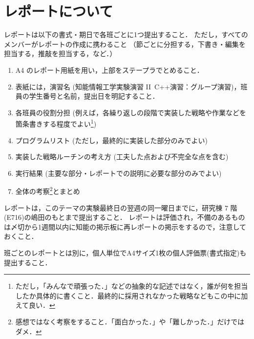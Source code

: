 \section{レポートについて}
レポートは以下の書式・期日で各班ごとに1つ提出すること．
ただし，すべてのメンバーがレポートの作成に携わること
（節ごとに分担する，下書き・編集を担当する，推敲を担当する，など．）
\begin{enumerate}
 \item A4 のレポート用紙を用い，上部をステープラでとめること．\vspace*{-0.5em}
 \item 表紙には，演習名 (知能情報工学実験演習 II\ C++演習：グループ演習)，班員の学生番号と名前，提出日を明記すること．\vspace*{-0.5em}
 \item 各班員の役割分担 (例えば，各繰り返しの段階で実装した戦略や作業などを箇条書きする程度でよい\footnote{ただし，「みんなで頑張った．」などの抽象的な記述ではなく，誰が何を担当したか具体的に書くこと．最終的に採用されなかった戦略などもこの中に加えて良い．})\vspace*{-0.5em}
 \item プログラムリスト (ただし，最終的に実装した部分のみでよい)\vspace*{-0.5em}
 \item 実装した戦略ルーチンの考え方 (工夫した点および不完全な点を含む)\vspace*{-0.5em}
 \item 実行結果 (主要な部分・レポートでの説明に必要な部分のみでよい)\vspace*{-0.5em}
 \item 全体の考察\footnote{感想ではなく考察をすること．「面白かった．」や「難しかった．」だけではダメ．}とまとめ\vspace*{-0.5em}
 \end{enumerate}
レポートは，このテーマの実験最終日の翌週の同一曜日までに，研究棟 7 階(E716)の嶋田のもとまで提出すること．
レポートは評価され，不備のあるものは〆切から1週間以内に知能の掲示板に再レポートの掲示をするので，注意しておくこと．

班ごとのレポートとは別に，個人単位でA4サイズ1枚の個人評価票(書式指定)も提出すること．

